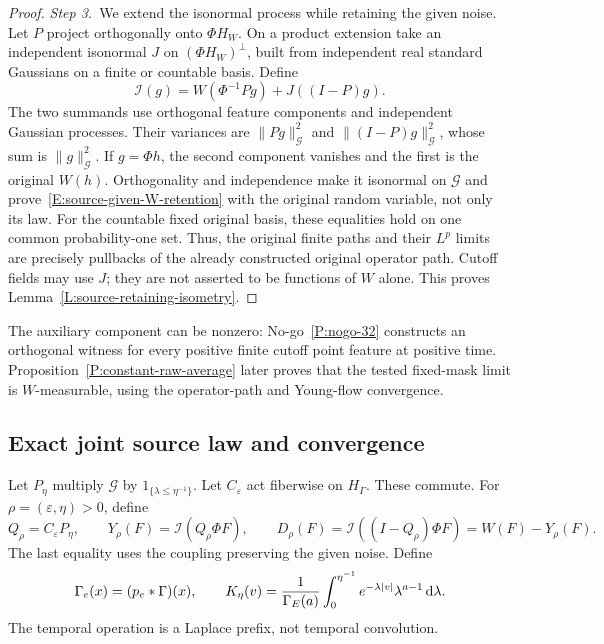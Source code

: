 \begin{proof}
  \medskip
  \noindent\textit{Step 3.~}We extend the isonormal process while retaining
  the given noise.
  Let $P$ project orthogonally onto $\Phi H_W$. On a product extension take an
  independent isonormal $J$ on $(\Phi H_W)^\perp$, built from independent real
  standard Gaussians on a finite or countable basis. Define
  \[
    \mathcal{I}(g)=W(\Phi^{-1}Pg)+J((I-P)g).
  \]
  The two summands use orthogonal feature components and independent Gaussian
  processes. Their variances are $\|Pg\|_{\mathcal G}^2$ and
  $\|(I-P)g\|_{\mathcal G}^2$, whose sum is $\|g\|_{\mathcal G}^2$. If $g =
  \Phi h$, the second component vanishes and the first is the original $W(h)$.
  Orthogonality and independence make it isonormal on $\mathcal{G}$ and
  prove~\eqref{E:source-given-W-retention} with the original random variable,
  not only its law. For the countable fixed original basis, these equalities
  hold on one common probability-one set. Thus, the original finite paths and
  their $L^p$ limits are precisely pullbacks of the already constructed original
  operator path. Cutoff fields may use $J$; they are not asserted to be
  functions of $W$ alone. This proves Lemma~\ref{L:source-retaining-isometry}.
\end{proof}

The auxiliary component can be nonzero: No-go~\ref{P:nogo-32}
constructs an orthogonal witness for every positive finite cutoff point
feature at positive time. Proposition~\ref{P:constant-raw-average} later
proves that the tested fixed-mask limit is $W$-measurable, using the
operator-path and Young-flow convergence.




\subsection{Exact joint source law and convergence}

Let $P_\eta$ multiply $\mathcal{G}$ by $1_{\{\lambda\le\eta^{-1}\}}$. Let
$C_\varepsilon$ act fiberwise on $H_\Gamma$. These commute. For $\rho =
(\varepsilon,\eta) > 0$, define
\begin{equation}\label{E:source-cutoff-noises}
  Q_\rho=C_\varepsilon P_\eta,\qquad
  Y_\rho(F)=\mathcal{I}(Q_\rho\Phi F),\qquad
  D_\rho(F)=\mathcal{I}((I-Q_\rho)\Phi F)=W(F)-Y_\rho(F).
\end{equation}
The last equality uses the coupling preserving the given noise. Define
\begin{equation}\label{E:source-covariance-functions}
  \Gamma_e(x)=(p_e*\Gamma)(x),\qquad
  K_\eta(v)=\frac1{\Gamma_E(a)}
  \int_0^{\eta^{-1}}e^{-\lambda|v|}\lambda^{a-1}\,\mathrm{d}\lambda.
\end{equation}
The temporal operation is a Laplace prefix, not temporal convolution.

